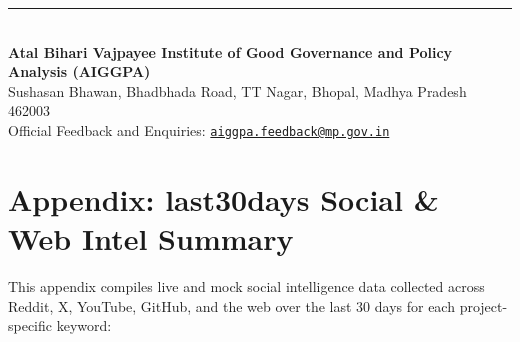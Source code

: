 \documentclass[11pt,a4paper]{article}
\begin{document}
\vspace{0.8cm}
\begin{center}
  \rule{0.6\textwidth}{1pt}\\[0.4cm]
  \textbf{\color{navyblue}Atal Bihari Vajpayee Institute of Good Governance and Policy Analysis (AIGGPA)}\\
  \fontsize{9}{11}\selectfont Sushasan Bhawan, Bhadbhada Road, TT Nagar, Bhopal, Madhya Pradesh 462003\\
  \fontsize{8.5}{10}\selectfont Official Feedback and Enquiries: \href{mailto:aiggpa.feedback@mp.gov.in}{\texttt{aiggpa.feedback@mp.gov.in}}
\end{center}






\newpage
\section{Appendix: last30days Social \& Web Intel Summary}
This appendix compiles live and mock social intelligence data collected across Reddit, X, YouTube, GitHub, and the web over the last 30 days for each project-specific keyword:
\end{document}
